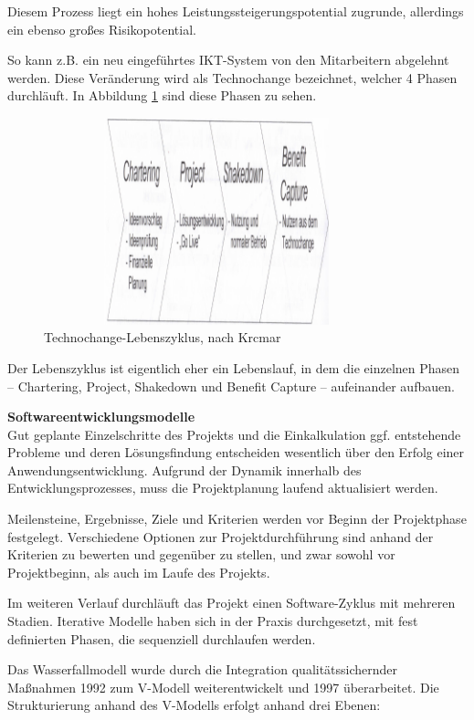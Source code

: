 Diesem Prozess liegt ein hohes Leistungssteigerungspotential zugrunde, allerdings ein ebenso großes Risikopotential. 

So kann z.B. ein neu eingeführtes IKT-System von den Mitarbeitern abgelehnt werden. Diese Veränderung wird als Technochange bezeichnet, welcher 4 Phasen durchläuft. In Abbildung \ref{fig_technochange_lebenszyklus} sind diese Phasen zu sehen.
\begin{figure}
	\centering
	\includegraphics[width=10cm, height=6cm]{kapitel/gruppe1_1/bilder/technochange_lebenszyklus}
	\caption{Technochange-Lebenszyklus, nach Krcmar}
	\label{fig_technochange_lebenszyklus}
\end{figure}
Der Lebenszyklus ist eigentlich eher ein Lebenslauf, in dem die einzelnen Phasen – Chartering, Project, Shakedown und Benefit Capture – aufeinander aufbauen.

\textbf{Softwareentwicklungsmodelle}\\
Gut geplante Einzelschritte des Projekts und die Einkalkulation ggf. entstehende Probleme und deren Lösungsfindung entscheiden wesentlich über den Erfolg einer Anwendungsentwicklung.
Aufgrund der Dynamik innerhalb des Entwicklungsprozesses, muss die Projektplanung laufend aktualisiert werden.

Meilensteine, Ergebnisse, Ziele und Kriterien werden vor Beginn der Projektphase festgelegt. Verschiedene Optionen zur Projektdurchführung sind anhand der Kriterien zu bewerten und gegenüber zu stellen, und zwar sowohl vor Projektbeginn, als auch im Laufe des Projekts.

Im weiteren Verlauf durchläuft das Projekt einen Software-Zyklus mit mehreren Stadien.  Iterative Modelle haben sich in der Praxis durchgesetzt, mit fest definierten Phasen, die sequenziell durchlaufen werden.

Das Wasserfallmodell wurde durch die Integration qualitätssichernder Maßnahmen 1992 zum V-Modell weiterentwickelt und 1997 überarbeitet. Die Strukturierung anhand des V-Modells erfolgt anhand drei Ebenen:

